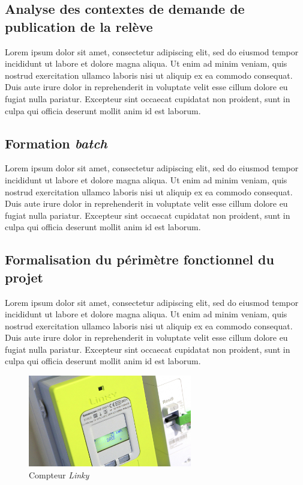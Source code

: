\documentclass[a4paper, 12pt]{report}
\begin{document}
\subsection{Analyse des contextes de demande de publication de la relève}

Lorem ipsum dolor sit amet, consectetur adipiscing elit, sed do eiusmod tempor incididunt ut labore et dolore magna aliqua. Ut enim ad minim veniam, quis nostrud exercitation ullamco laboris nisi ut aliquip ex ea commodo consequat. Duis aute irure dolor in reprehenderit in voluptate velit esse cillum dolore eu fugiat nulla pariatur. Excepteur sint occaecat cupidatat non proident, sunt in culpa qui officia deserunt mollit anim id est laborum.

\subsection{Formation \textit{batch}}

Lorem ipsum dolor sit amet, consectetur adipiscing elit, sed do eiusmod tempor incididunt ut labore et dolore magna aliqua. Ut enim ad minim veniam, quis nostrud exercitation ullamco laboris nisi ut aliquip ex ea commodo consequat. Duis aute irure dolor in reprehenderit in voluptate velit esse cillum dolore eu fugiat nulla pariatur. Excepteur sint occaecat cupidatat non proident, sunt in culpa qui officia deserunt mollit anim id est laborum.

\subsection{Formalisation du périmètre fonctionnel du projet}

Lorem ipsum dolor sit amet, consectetur adipiscing elit, sed do eiusmod tempor incididunt ut labore et dolore magna aliqua. Ut enim ad minim veniam, quis nostrud exercitation ullamco laboris nisi ut aliquip ex ea commodo consequat. Duis aute irure dolor in reprehenderit in voluptate velit esse cillum dolore eu fugiat nulla pariatur. Excepteur sint occaecat cupidatat non proident, sunt in culpa qui officia deserunt mollit anim id est laborum.

\begin{figure}[b]
  \begin{center}
    \includegraphics[height=4cm]{../res/linky.jpg}
    \caption{Compteur \textit{Linky}}
  \end{center}
\end{figure}
\end{document}
